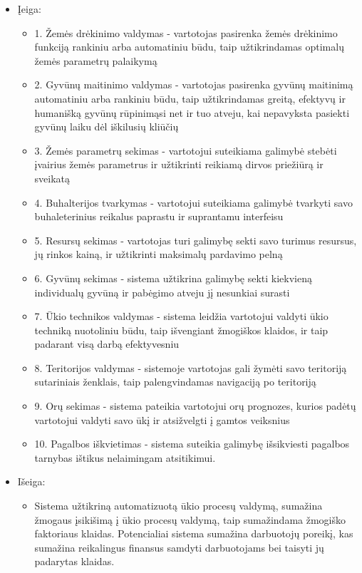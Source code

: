 \documentclass[oneside]{VUMIFPSkursinis}
\begin{document}
	\begin{itemize}
		\item{Įeiga: }
		\begin{itemize}
			\item{1. Žemės drėkinimo valdymas - vartotojas pasirenka žemės drėkinimo funkciją rankiniu arba automatiniu būdu, taip užtikrindamas optimalų žemės parametrų palaikymą}
			\item{2. Gyvūnų maitinimo valdymas - vartotojas pasirenka gyvūnų maitinimą automatiniu arba rankiniu būdu, taip užtikrindamas greitą, efektyvų ir humanišką gyvūnų rūpinimąsi net ir tuo atveju, kai nepavyksta pasiekti gyvūnų laiku dėl iškilusių kliūčių}
			\item{3. Žemės parametrų sekimas - vartotojui suteikiama galimybė stebėti įvairius žemės parametrus ir užtikrinti reikiamą dirvos priežiūrą ir sveikatą}
			\item{4. Buhalterijos tvarkymas - vartotojui suteikiama galimybė tvarkyti savo buhaleterinius reikalus paprastu ir suprantamu interfeisu}
			\item{5. Resursų sekimas - vartotojas turi galimybę sekti savo turimus resursus, jų rinkos kainą, ir užtikrinti maksimalų pardavimo pelną}
			\item{6. Gyvūnų sekimas - sistema užtikrina galimybę sekti kiekvieną individualų gyvūną ir pabėgimo atveju jį nesunkiai surasti}
			\item{7. Ūkio technikos valdymas - sistema leidžia vartotojui valdyti ūkio techniką nuotoliniu būdu, taip išvengiant žmogiškos klaidos, ir taip padarant visą darbą efektyvesniu}
			\item{8. Teritorijos valdymas - sistemoje vartotojas gali žymėti savo teritoriją sutariniais ženklais, taip palengvindamas navigaciją po teritoriją}
			\item{9. Orų sekimas - sistema pateikia vartotojui orų prognozes, kurios padėtų vartotojui valdyti savo ūkį ir atsižvelgti į gamtos veiksnius}
			\item{10. Pagalbos iškvietimas - sistema suteikia galimybę išsikviesti pagalbos tarnybas ištikus nelaimingam atsitikimui.}
		\end{itemize}
		\item{Išeiga:}
		\begin{itemize}
			\item{Sistema užtikriną automatizuotą ūkio procesų valdymą, sumažina žmogaus įsikišimą į ūkio procesų valdymą, taip sumažindama žmogiško faktoriaus klaidas. Potencialiai sistema sumažina darbuotojų poreikį, kas sumažina reikalingus finansus samdyti darbuotojams bei taisyti jų padarytas klaidas.}

\end{itemize}
\end{itemize}
\end{document}
